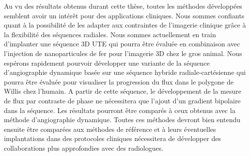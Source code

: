Au vu des résultats obtenus durant cette thèse, toutes les méthodes développées semblent avoir un intérêt pour des applications cliniques. Nous sommes confiants quant à la possibilité de les adapter aux contraintes de l'imagerie clinique grâce à la flexibilité des séquences radiales. 
Nous sommes actuellement en train d'implanter une séquence 3D UTE qui pourra être évaluée en combinaison avec l'injection de nanoparticules de fer pour l'imagerie 3D chez le gros animal. Nous espérons rapidement pourvoir développer une variante de la séquence d'angiographie dynamique basée sur une séquence hybride radiale-cartésienne qui pourra être évaluée pour visualiser la progression du flux dans le polygone de Willis chez l'humain. A partir de cette séquence, le développement de la mesure de flux par contraste de phase ne nécessitera que l'ajout d'un gradient bipolaire dans la séquence. Les résultats pourront être comparés à ceux obtenus avec la méthode d'angiographie dynamique.
Toutes ces méthodes devront bien entendu ensuite être comparées aux méthodes de référence et à leurs éventuelles implantations dans des protocoles cliniques nécessitera de développer des collaborations plus approfondies avec des radiologues.

